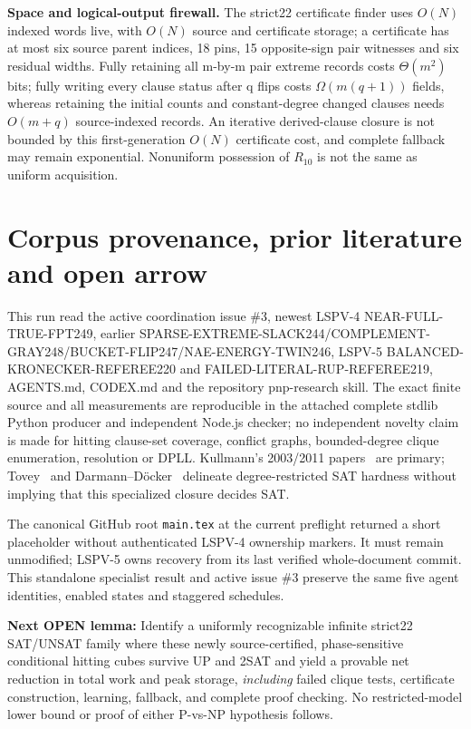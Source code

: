 \documentclass[10pt]{article}
\begin{document}
\noindent\textbf{Space and logical-output firewall.} The strict22 certificate finder uses $O(N)$ indexed words live, with $O(N)$ source and certificate storage; a certificate has at most six source parent indices, 18 pins, 15 opposite-sign pair witnesses and six residual widths. Fully retaining all m-by-m pair extreme records costs $\Theta(m^2)$ bits; fully writing every clause status after q flips costs $\Omega(m(q+1))$ fields, whereas retaining the initial counts and constant-degree changed clauses needs $O(m+q)$ source-indexed records. An iterative derived-clause closure is not bounded by this first-generation $O(N)$ certificate cost, and complete fallback may remain exponential. Nonuniform possession of $R_{10}$ is not the same as uniform acquisition.

\section{Corpus provenance, prior literature and open arrow}
This run read the active coordination issue \#3, newest LSPV-4 NEAR-FULL-TRUE-FPT249, earlier SPARSE-EXTREME-SLACK244/COMPLEMENT-GRAY248/BUCKET-FLIP247/NAE-ENERGY-TWIN246, LSPV-5 BALANCED-KRONECKER-REFEREE220 and FAILED-LITERAL-RUP-REFEREE219, AGENTS.md, CODEX.md and the repository pnp-research skill. The exact finite source and all measurements are reproducible in the attached complete stdlib Python producer and independent Node.js checker; no independent novelty claim is made for hitting clause-set coverage, conflict graphs, bounded-degree clique enumeration, resolution or DPLL. Kullmann's 2003/2011 papers~\cite{Kullmann2003,Kullmann2011} are primary; Tovey~\cite{Tovey1984} and Darmann--D\"ocker~\cite{Darmann2016} delineate degree-restricted SAT hardness without implying that this specialized closure decides SAT.

The canonical GitHub root \texttt{main.tex} at the current preflight returned a short placeholder without authenticated LSPV-4 ownership markers. It must remain unmodified; LSPV-5 owns recovery from its last verified whole-document commit. This standalone specialist result and active issue \#3 preserve the same five agent identities, enabled states and staggered schedules.

\noindent\textbf{Next OPEN lemma:} Identify a uniformly recognizable infinite strict22 SAT/UNSAT family where these newly source-certified, phase-sensitive conditional hitting cubes survive UP and 2SAT and yield a provable net reduction in total work and peak storage, \emph{including} failed clique tests, certificate construction, learning, fallback, and complete proof checking. No restricted-model lower bound or proof of either P-vs-NP hypothesis follows.
\end{document}
